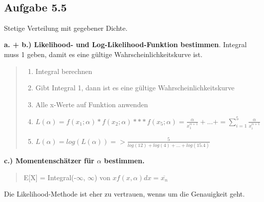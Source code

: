 \documentclass[11pt]{article}
\providecommand{\tightlist}{%
      \setlength{\itemsep}{0pt}\setlength{\parskip}{0pt}}
\begin{document}
    \begin{center}
    \end{center}
    { \hspace*{\fill} \\}
    
    \subsection{Aufgabe 5.5}\label{aufgabe-5.5}

    Stetige Verteilung mit gegebener Dichte.

\textbf{a. + b.) Likelihood- und Log-Likelihood-Funktion bestimmen}.
Integral muss 1 geben, damit es eine gültige Wahrscheinlichkeitskurve
ist.

\begin{quote}
\begin{enumerate}
\def\labelenumi{\arabic{enumi}.}
\tightlist
\item
  Integral berechnen
\item
  Gibt Integral 1, dann ist es eine gültige Wahrscheinlichkeitskurve
\item
  Alle x-Werte auf Funktion anwenden
\item
  \(L(\alpha) = f(x_1 ; \alpha) * f(x_2 ; \alpha) *** f(x_5 ; \alpha) = \frac{\alpha}{x_1^{\alpha + 1}} + ... + = \displaystyle\sum_{i=1}^{5} \frac{\alpha}{x_i^{\alpha + 1}}\)
\item
  \(L(\alpha) = log(L(\alpha)) => \frac{5}{log(12) + log(4) + ... + log(15.4)}\)
\end{enumerate}
\end{quote}

    \textbf{c.) Momentenschätzer für \(\alpha\) bestimmen.}

\begin{quote}
E{[}X{]} = Integral(-\(\infty\), \(\infty\)) von
\(xf(x, \alpha)dx = \overline{x_n}\)
\end{quote}

Die Likelihood-Methode ist eher zu vertrauen, wenns um die Genauigkeit
geht.


    
    
    
    
\end{document}

